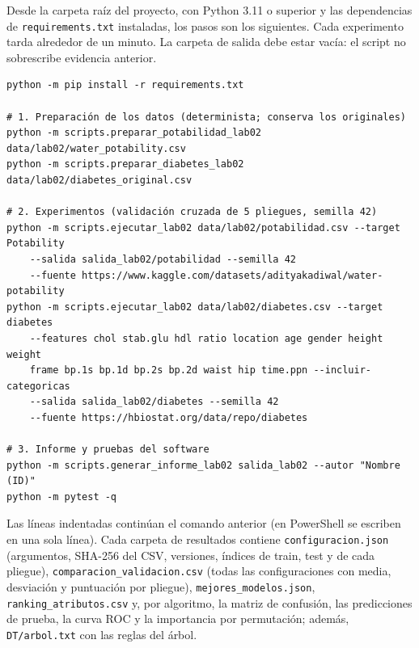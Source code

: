 Desde la carpeta raíz del proyecto, con Python 3.11 o superior y las dependencias de
\texttt{requirements.txt} instaladas, los pasos son los siguientes. Cada
experimento tarda alrededor de un minuto. La carpeta de salida debe estar vacía: el
script no sobrescribe evidencia anterior.

\begin{verbatim}
python -m pip install -r requirements.txt

# 1. Preparación de los datos (determinista; conserva los originales)
python -m scripts.preparar_potabilidad_lab02 data/lab02/water_potability.csv
python -m scripts.preparar_diabetes_lab02 data/lab02/diabetes_original.csv

# 2. Experimentos (validación cruzada de 5 pliegues, semilla 42)
python -m scripts.ejecutar_lab02 data/lab02/potabilidad.csv --target Potability
    --salida salida_lab02/potabilidad --semilla 42
    --fuente https://www.kaggle.com/datasets/adityakadiwal/water-potability
python -m scripts.ejecutar_lab02 data/lab02/diabetes.csv --target diabetes
    --features chol stab.glu hdl ratio location age gender height weight
    frame bp.1s bp.1d bp.2s bp.2d waist hip time.ppn --incluir-categoricas
    --salida salida_lab02/diabetes --semilla 42
    --fuente https://hbiostat.org/data/repo/diabetes

# 3. Informe y pruebas del software
python -m scripts.generar_informe_lab02 salida_lab02 --autor "Nombre (ID)"
python -m pytest -q
\end{verbatim}

Las líneas indentadas continúan el comando anterior (en PowerShell se escriben en una
sola línea). Cada carpeta de resultados contiene \texttt{configuracion.json} (argumentos,
SHA-256 del CSV, versiones, índices de train, test y de cada pliegue),
\texttt{comparacion\_validacion.csv} (todas las configuraciones con media, desviación y
puntuación por pliegue), \texttt{mejores\_modelos.json}, \texttt{ranking\_atributos.csv}
y, por algoritmo, la matriz de confusión, las predicciones de prueba, la curva ROC y la
importancia por permutación; además, \texttt{DT/arbol.txt} con las reglas del árbol.
